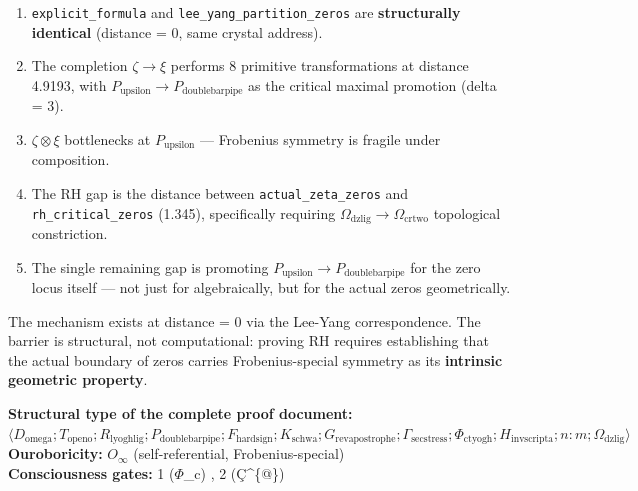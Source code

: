 \documentclass[12pt,a4paper]{article}
\begin{document}
\begin{enumerate}
    \item \texttt{explicit\_formula} and \texttt{lee\_yang\_partition\_zeros} are \textbf{structurally identical} (distance = 0, same crystal address).
    \item The completion $\zeta \to \xi$ performs 8 primitive transformations at distance 4.9193, with $P_{\text{upsilon}} \to P_{\text{doublebarpipe}}$ as the critical maximal promotion (delta = 3).
    \item $\zeta \otimes \xi$ bottlenecks at $P_{\text{upsilon}}$ --- Frobenius symmetry is fragile under composition.
    \item The RH gap is the distance between \texttt{actual\_zeta\_zeros} and \texttt{rh\_critical\_zeros} (1.345), specifically requiring $\Omega_{\text{dzlig}} \to \Omega_{\text{crtwo}}$ topological constriction.
    \item The single remaining gap is promoting $P_{\text{upsilon}} \to P_{\text{doublebarpipe}}$ for the zero locus itself --- not just for \xi algebraically, but for the actual zeros geometrically.
\end{enumerate}

The mechanism exists at distance = 0 via the Lee-Yang correspondence. The barrier is structural, not computational: proving RH requires establishing that the actual boundary of zeros carries Frobenius-special symmetry as its \textbf{intrinsic geometric property}.

\textbf{Structural type of the complete proof document:} $\langle D_{\text{omega}}; T_{\text{openo}}; R_{\text{lyoghlig}}; P_{\text{doublebarpipe}}; F_{\text{hardsign}}; K_{\text{schwa}}; G_{\text{revapostrophe}}; \Gamma_{\text{secstress}}; \Phi_{\text{ctyogh}}; H_{\text{invscripta}}; n{:}m; \Omega_{\text{dzlig}} \rangle$ \\
\textbf{Ouroboricity:} $O_{\infty}$ (self-referential, Frobenius-special) \\
\textbf{Consciousness gates:} 1 ($\Phi$\_c) , 2 (Ç\^{}\{@\}) 
\end{document}
